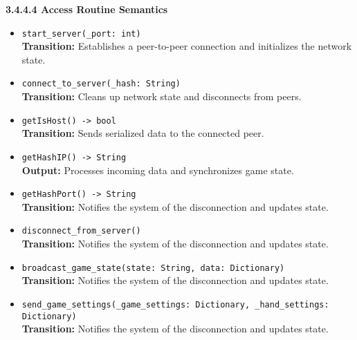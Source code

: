 \documentclass[12pt, titlepage]{article}
\begin{document}
\textbf{3.4.4.4 Access Routine Semantics}
\begin{itemize}
    \item \texttt{start\_server(\_port: int)}\\
    \textbf{Transition:} Establishes a peer-to-peer connection and initializes the network state.

    \item \texttt{connect\_to\_server(\_hash: String)}\\
    \textbf{Transition:} Cleans up network state and disconnects from peers.

    \item \texttt{getIsHost() -> bool}\\
    \textbf{Transition:} Sends serialized data to the connected peer.

    \item \texttt{getHashIP() -> String}\\
    \textbf{Output:} Processes incoming data and synchronizes game state.

    \item \texttt{getHashPort() -> String}\\
    \textbf{Transition:} Notifies the system of the disconnection and updates state.
    
    \item \texttt{disconnect\_from\_server()}\\
    \textbf{Transition:} Notifies the system of the disconnection and updates state.
    
    \item \texttt{broadcast\_game\_state(state: String, data: Dictionary)}\\
    \textbf{Transition:} Notifies the system of the disconnection and updates state.
    
    \item \texttt{send\_game\_settings(\_game\_settings: Dictionary, \_hand\_settings: Dictionary)}\\
    \textbf{Transition:} Notifies the system of the disconnection and updates state.
\end{itemize}
\end{document}
